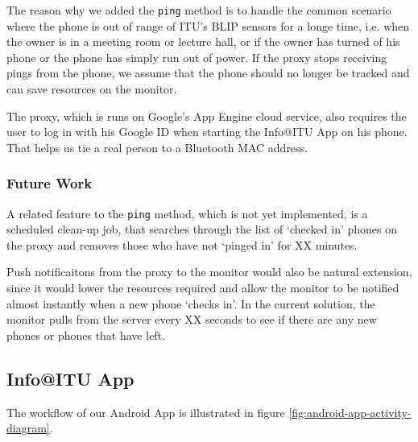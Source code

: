\documentclass{ubicomp2011}
\begin{document}
The reason why we added the \texttt{ping} method is to handle the common scenario where the phone is out of range of ITU's BLIP sensors for a longe time, i.e. when the owner is in a meeting room or lecture hall, or if the owner has turned of his phone or the phone has simply run out of power. If the proxy stops receiving pings from the phone, we assume that the phone should no longer be tracked and can save resources on the monitor.

The proxy, which is runs on Google's App Engine cloud service, also requires the user to log in with his Google ID when starting the Info@ITU App on his phone. That helps us tie a real person to a Bluetooth MAC address.

\subsubsection{Future Work}
A related feature to the \texttt{ping} method, which is not yet implemented, is a scheduled clean-up job, that searches through the list of `checked in' phones on the proxy and removes those who have not `pinged in' for XX minutes.

Push notificaitons from the proxy to the monitor would also be natural extension, since it would lower the resources required and allow the monitor to be notified almost instantly when a new phone `checks in'. In the current solution, the monitor pulls from the server every XX seconds to see if there are any new phones or phones that have left.

\subsection{Info@ITU App}
The workflow of our Android App is illustrated in figure \ref{fig:android-app-activity-diagram}. 
 
\end{document}
